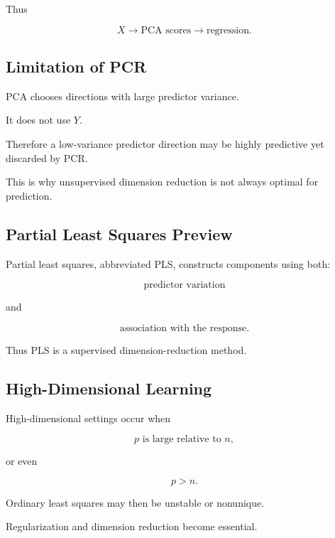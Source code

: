Thus

\[
\boxed{
X
\longrightarrow
\text{PCA scores}
\longrightarrow
\text{regression}.
}
\]

\subsection{Limitation of PCR}
\label{subsec:pcr-limitation}

PCA chooses directions with large predictor variance.

It does not use \(Y\).

Therefore a low-variance predictor direction may be highly predictive yet
discarded by PCR.

This is why unsupervised dimension reduction is not always optimal for
prediction.

\subsection{Partial Least Squares Preview}
\label{subsec:partial-least-squares}

Partial least squares, abbreviated PLS, constructs components using both:

\[
\boxed{
\text{predictor variation}
}
\]

and

\[
\boxed{
\text{association with the response}.
}
\]

Thus PLS is a supervised dimension-reduction method.

\subsection{High-Dimensional Learning}
\label{subsec:high-dimensional-learning}

High-dimensional settings occur when

\[
\boxed{
p
\text{ is large relative to }
n,
}
\]

or even

\[
\boxed{
p>n.
}
\]

Ordinary least squares may then be unstable or nonunique.

Regularization and dimension reduction become essential.

